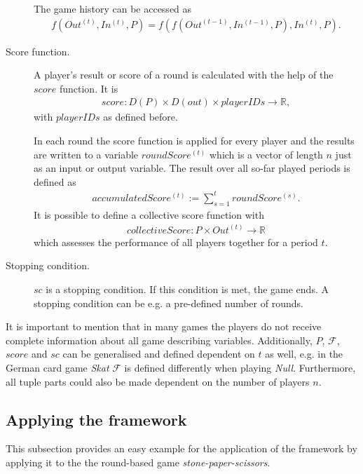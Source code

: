 \begin{description}
    The game history can be accessed as
     \begin{align} 
        f(Out^{(t)}, In^{(t)}, P) = f(f(Out^{(t-1)}, In^{(t-1)}, P), In^{(t)}, P).  \label{eq:hist} 
    \end{align}
    
    \item[Score function.] A player's result or score of a round is calculated with the help of the $score$ function. It is 
    \begin{align} 
        score \colon D(P) \times D(out) \times playerIDs \to \mathbb{R},
        \label{eq:score}
    \end{align} with $playerIDs$ as defined before.
    
    In each round the score function is applied for every player and the results are written to a variable $roundScore^{(t)}$ which is a vector of length $n$ just as an input or output variable. The result over all so-far played periods is defined as
    \begin{align}
        accumulatedScore^{(t)} := \sum\nolimits_{s=1}^t roundScore^{(s)}.
        \label{eq:accumulated}
    \end{align}It is possible to define  a collective score function with \begin{align}
        collectiveScore \colon P \times Out^{(t)} \to \mathbb{R}
        \label{eq:collectivescore}
    \end{align} which assesses the performance of all players together for a period $t$.
    \item[Stopping condition.] $sc$ is a stopping condition. If this condition is met, the game ends. A stopping condition can be e.g. a pre-defined number of rounds.
\end{description}
It is important to mention that in many games the players do not receive complete information about all game describing variables.
Additionally, $P$, $\mathcal{F}$, $score$ and $sc$ can be generalised and defined dependent on $t$ as well, e.g. in the German card game \textit{Skat} $\mathcal{F}$ is defined differently when playing \textit{Null}.
Furthermore, all tuple parts could also be made dependent on the number of players $n$.

\subsection{Applying the framework}
\label{subsec:apply}
This subsection provides an easy example for the application of the framework by applying it to the the round-based game \textit{stone-paper-scissors}.


